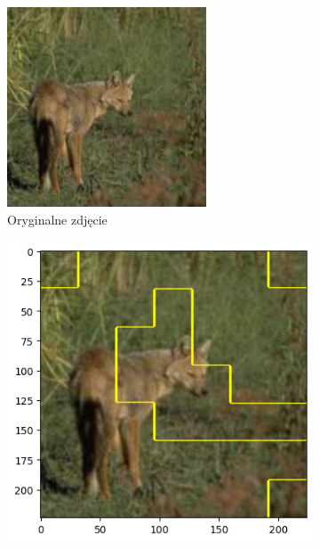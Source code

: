 \begin{figure}[h]
	\centering
	\begin{subfigure}[b]{0.3\textwidth}
		\includegraphics[width=.9\textwidth]{img/examples/appendix/n02114712_40677}
		\caption{Oryginalne zdjęcie}  \label{}
	\end{subfigure}
	\begin{subfigure}[b]{0.3\textwidth}
		\centering\includegraphics[width=.9\textwidth]{img/examples/appendix/n02114712_40677_gradcam}

\end{subfigure}
\end{figure}
